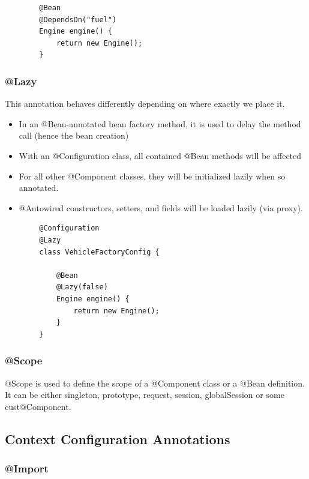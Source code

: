 \documentclass{scrartcl}
\begin{document}
     \begin{lstlisting}
        @Bean
        @DependsOn("fuel")
        Engine engine() {
            return new Engine();
        }
    \end{lstlisting}

\subsubsection{@Lazy}

    This annotation behaves differently depending on where exactly we place it.

    \begin{itemize}
        \item In an @Bean-annotated bean factory method, it is used to delay the method call (hence the bean creation)
        \item With an @Configuration class, all contained @Bean methods will be affected
        \item For all other @Component classes,  they will be initialized lazily when so annotated.
        \item @Autowired constructors, setters, and fields will be loaded lazily (via proxy).
    \end{itemize}

    \begin{lstlisting}
        @Configuration
        @Lazy
        class VehicleFactoryConfig {

            @Bean
            @Lazy(false)
            Engine engine() {
                return new Engine();
            }
        }
    \end{lstlisting}

\subsubsection{@Scope}

    @Scope is used to define the scope of a @Component class or a @Bean definition. It can be either singleton, prototype, request, session, globalSession or some cust@Component.

\subsection{Context Configuration Annotations}

\subsubsection{@Import}
\end{document}
